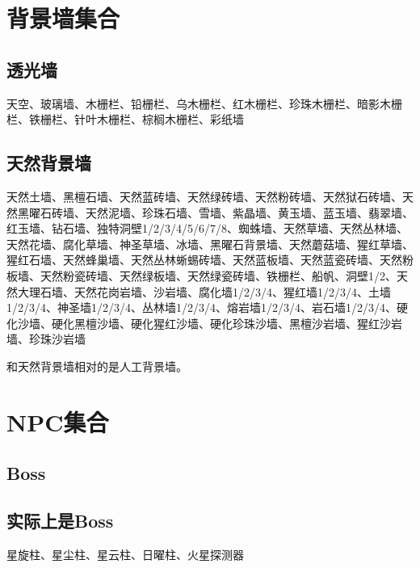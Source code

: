\section{背景墙集合}
\subsection{透光墙}\label{app9}
天空、玻璃墙、木栅栏、铅栅栏、乌木栅栏、红木栅栏、珍珠木栅栏、暗影木栅栏、铁栅栏、针叶木栅栏、棕榈木栅栏、彩纸墙
\subsection{天然背景墙}\label{app39}
天然土墙、黑檀石墙、天然蓝砖墙、天然绿砖墙、天然粉砖墙、天然狱石砖墙、天然黑曜石砖墙、天然泥墙、珍珠石墙、雪墙、紫晶墙、黄玉墙、蓝玉墙、翡翠墙、红玉墙、钻石墙、独特洞壁1/2/3/4/5/6/7/8、蜘蛛墙、天然草墙、天然丛林墙、天然花墙、腐化草墙、神圣草墙、冰墙、黑曜石背景墙、天然蘑菇墙、猩红草墙、猩红石墙、天然蜂巢墙、天然丛林蜥蜴砖墙、天然蓝板墙、天然蓝瓷砖墙、天然粉板墙、天然粉瓷砖墙、天然绿板墙、天然绿瓷砖墙、铁栅栏、船帆、洞壁1/2、天然大理石墙、天然花岗岩墙、沙岩墙、腐化墙1/2/3/4、猩红墙1/2/3/4、土墙1/2/3/4、神圣墙1/2/3/4、丛林墙1/2/3/4、熔岩墙1/2/3/4、岩石墙1/2/3/4、硬化沙墙、硬化黑檀沙墙、硬化猩红沙墙、硬化珍珠沙墙、黑檀沙岩墙、猩红沙岩墙、珍珠沙岩墙

和天然背景墙相对的是人工背景墙。

\section{NPC集合}
\subsection{Boss}
\subsection{实际上是Boss}\label{app10}
星旋柱、星尘柱、星云柱、日曜柱、火星探测器